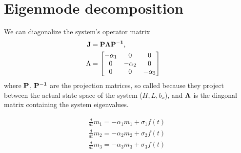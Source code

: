 \documentclass[tc, manuscript]{copernicus}
\begin{document}
\section{Eigenmode decomposition}     %
We can diagonalize the system's operator matrix 
\begin{align}
\bf{J} &= \bf{P} \Lambda \bf{P^{-1}},& \\
\Lambda &=  \begin{bmatrix}
   -\alpha_1 & 0 & 0  \\
   0 & -\alpha_2 & 0 \\
   0 & 0 & -\alpha_3
   \end{bmatrix}&
\end{align}
where $\bf{P}$, $\bf{P^{-1}}$ are the projection matrices, so called because they project between the actual state space of the system ($H, L, b_x$), and $\bf{\Lambda}$ is the diagonal matrix containing the system eigenvalues.

\begin{align}
\frac{d}{dt} m_1 = -\alpha_1 m_1 + \sigma_1 f(t)\\
\frac{d}{dt} m_2 = -\alpha_2 m_2 + \sigma_2 f(t)\\
\frac{d}{dt} m_3 = -\alpha_3 m_3 + \sigma_3 f(t)
\end{align}



\noappendix       %




\appendixfigures  %

\appendixtables   %

\end{document}
